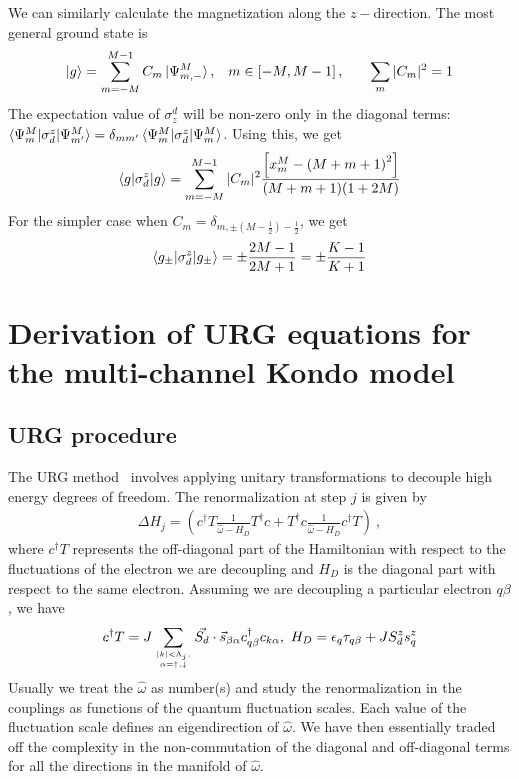 \documentclass[12pt]{revtex4-2}
\begin{document}
We can similarly calculate the magnetization along the \(z-\)direction. The most general ground state is
\begin{align}
	\ket{g} = \sum_{m=-M}^{M-1} C_m \ket{\Psi^M_{m,-}}, &&& m \in \left[-M, M-1\right], &&& \sum_m |C_m|^2 = 1
\end{align}
The expectation value of \(\sigma^d_z\) will be non-zero only in the diagonal terms: \(\braket{\Psi^M_m | \sigma^z_d | \Psi^M_{m^\prime}} = \delta_{mm^\prime}\braket{\Psi^M_m | \sigma^z_d | \Psi^M_{m}}\). Using this, we get
\begin{align}
	\braket{g|\sigma^z_d|g} = \sum_{m=-M}^{M-1} |C_m|^2 \frac{\left[x_m^M - \left(M + m + 1\right)^2\right]}{{(M+m+1)(1+2M)}}
\end{align}
For the simpler case when \(C_m = \delta_{m,\pm (M - \frac{1}{2}) - \frac{1}{2}}\), we get
\begin{align}
	\braket{g_\pm|\sigma^z_d|g_\pm} = \pm \frac{2M-1}{2M+1} = \pm \frac{K-1}{K+1}
\end{align}

\section{Derivation of URG equations for the multi-channel Kondo model}

\subsection{URG procedure}
The URG method~\cite{anirbanurg1,anirbanurg2,anirbanmott1,anirbanmott2,siddharthacpi,santanukagome} involves applying unitary transformations to decouple high energy degrees of freedom. The renormalization at step \(j\) is given by
\begin{align}
	\Delta H_j = \left(c^\dagger T \frac{1}{\hat \omega - H_D}T^\dagger c + T^\dagger c \frac{1}{\hat \omega - H_D}c^\dagger T\right)~,
\end{align}
where \(c^\dagger T\) represents the off-diagonal part of the Hamiltonian with respect to the fluctuations of the electron we are decoupling and \(H_D\) is the diagonal part with respect to the same electron. Assuming we are decoupling a particular electron \(q\beta\), we have
\begin{align}
	c^\dagger T = J \sum_{|k| < \Lambda_j, \atop{\alpha=\uparrow,\downarrow}}\vec{S_d}\cdot\vec{s}_{\beta \alpha}c^\dagger_{q\beta}c_{k\alpha}, ~H_D = \epsilon_q \tau_{q\beta} + J S_d^z s_q^z
\end{align}
Usually we treat the \(\hat \omega\) as number(s) and study the renormalization in the couplings as functions of the quantum fluctuation scales. Each value of the fluctuation scale defines an eigendirection of \(\hat \omega\). We have then essentially traded off the complexity in the non-commutation of the diagonal and off-diagonal terms for all the directions in the manifold of \(\hat \omega\).
\end{document}
